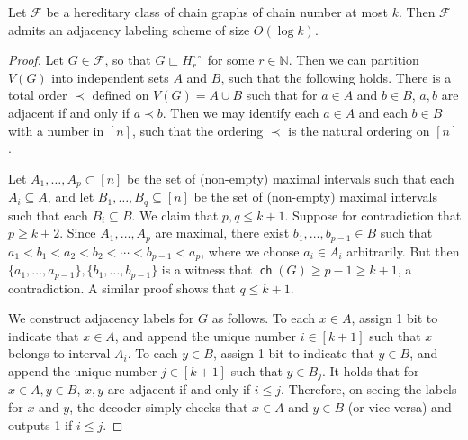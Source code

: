 \documentclass{theoretics}
\newcommand{\cF}{\ensuremath{\mathcal{F}}}
\newcommand{\bN}{\ensuremath{\mathbb{N}}}
\DeclareMathOperator\ch{\mathsf{ch}}
\newcommand{\dcirc}{{\circ\circ}}
\begin{document}
\begin{proposition}
\label{prop:chain-labeling-scheme}
Let $\cF$ be a hereditary class of chain graphs of chain number at most $k$.
Then $\cF$ admits an adjacency labeling scheme of size $O(\log k)$.
\end{proposition}
\begin{proof}
Let $G \in \cF$, so that $G \sqsubset H_r^{\dcirc}$ for some $r \in \bN$. Then we can partition
$V(G)$ into independent sets $A$ and $B$, such that
the following holds. There is a total order $\prec$ defined on $V(G) = A \cup B$ such that for $a
\in A$ and $b \in B$, $a,b$ are adjacent if and only if $a \prec b$. Then we may identify each $a
\in A$ and each $b \in B$ with a number in $[n]$, such that the ordering $\prec$ is the natural
ordering on $[n]$.

Let $A_1, \dotsc, A_p \subset [n]$ be the set of (non-empty) maximal intervals such that each $A_i
\subseteq A$, and let $B_1, \dotsc, B_q \subseteq [n]$ be the set of (non-empty) maximal intervals
such that each $B_i \subseteq B$. We claim that $p,q \leq k+1$. Suppose for contradiction that $p
\geq k+2$. Since $A_1, \dotsc, A_p$ are maximal, there exist $b_1, \dotsc, b_{p-1} \in B$ such that
$a_1 < b_1 < a_2 < b_2 < \dotsm < b_{p-1} < a_p$, where we choose $a_i \in A_i$ arbitrarily. But
then $\{a_1, \dotsc, a_{p-1}\}, \{b_1, \dotsc, b_{p-1}\}$ is a witness that $\ch(G) \geq p-1 \geq
k+1$, a contradiction. A similar proof shows that $q \leq k+1$.

We construct adjacency labels for $G$ as follows. To each $x \in A$, assign 1 bit to indicate that
$x \in A$, and append the unique number $i \in [k+1]$ such that $x$ belongs to interval $A_i$. To
each $y \in B$, assign 1 bit to indicate that $y \in B$, and append the unique number $j \in [k+1]$
such that $y \in B_j$. It holds that for $x \in A, y \in B$, $x,y$ are adjacent if and only if
$i \leq j$. Therefore, on seeing the labels for $x$ and $y$, the decoder simply checks that $x \in
A$ and $y \in B$ (or vice versa) and outputs 1 if $i \leq j$.
\end{proof}
\end{document}
